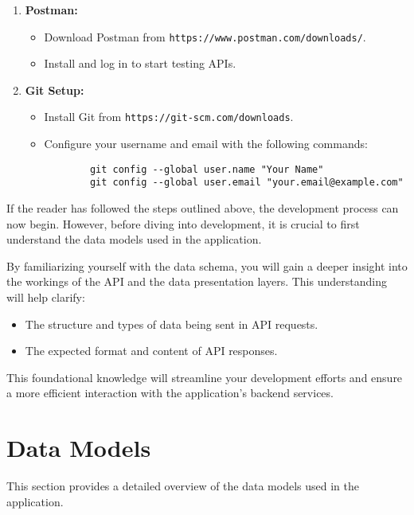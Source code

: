 \begin{enumerate}
    \item \textbf{Postman:}\cite{postman}
    \begin{itemize}
        \item Download Postman from \texttt{https://www.postman.com/downloads/}.
        \item Install and log in to start testing APIs.
    \end{itemize}

    \item \textbf{Git Setup:}
    \begin{itemize}
        \item Install Git from \texttt{https://git-scm.com/downloads}.
        \item Configure your username and email with the following commands:
        \begin{verbatim}
        git config --global user.name "Your Name"
        git config --global user.email "your.email@example.com"
        \end{verbatim}
    \end{itemize}
\end{enumerate}



If the reader has followed the steps outlined above, the development process can now begin. However, before diving into development, it is crucial to first understand the data models used in the application.

By familiarizing yourself with the data schema, you will gain a deeper insight into the workings of the API and the data presentation layers. This understanding will help clarify:
\begin{itemize}
    \item The structure and types of data being sent in API requests.
    \item The expected format and content of API responses.
\end{itemize}

This foundational knowledge will streamline your development efforts and ensure a more efficient interaction with the application’s backend services.






\section{Data Models}

This section provides a detailed overview of the data models used in the application.

